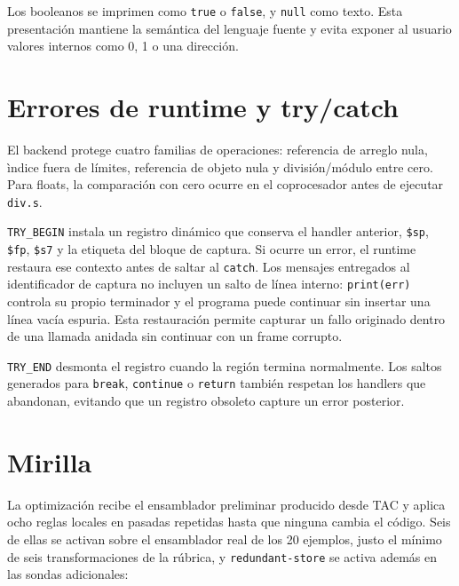 \documentclass[11pt,letterpaper,oneside]{report}
\newcommand{\codigo}[1]{\texttt{#1}}
\begin{document}
Los booleanos se imprimen como \codigo{true} o \codigo{false}, y \codigo{null} como texto. Esta presentaci\'on mantiene la sem\'antica del lenguaje fuente y evita exponer al usuario valores internos como 0, 1 o una direcci\'on.

\section{Errores de runtime y try/catch}

El backend protege cuatro familias de operaciones: referencia de arreglo nula, \`indice fuera de l\'imites, referencia de objeto nula y divisi\'on/m\'odulo entre cero. Para floats, la comparaci\'on con cero ocurre en el coprocesador antes de ejecutar \codigo{div.s}.

\codigo{TRY\_BEGIN} instala un registro din\'amico que conserva el handler anterior, \codigo{\$sp}, \codigo{\$fp}, \codigo{\$s7} y la etiqueta del bloque de captura. Si ocurre un error, el runtime restaura ese contexto antes de saltar al \codigo{catch}. Los mensajes entregados al identificador de captura no incluyen un salto de l\'inea interno: \codigo{print(err)} controla su propio terminador y el programa puede continuar sin insertar una l\'inea vac\'ia espuria. Esta restauraci\'on permite capturar un fallo originado dentro de una llamada anidada sin continuar con un frame corrupto.

\codigo{TRY\_END} desmonta el registro cuando la regi\'on termina normalmente. Los saltos generados para \codigo{break}, \codigo{continue} o \codigo{return} tambi\'en respetan los handlers que abandonan, evitando que un registro obsoleto capture un error posterior.

\section{Mirilla}

La optimizaci\'on recibe el ensamblador preliminar producido desde TAC y aplica ocho reglas locales en pasadas repetidas hasta que ninguna cambia el c\'odigo. Seis de ellas se activan sobre el ensamblador real de los 20 ejemplos, justo el m\'inimo de seis transformaciones de la r\'ubrica, y \codigo{redundant-store} se activa adem\'as en las sondas adicionales:
\end{document}

